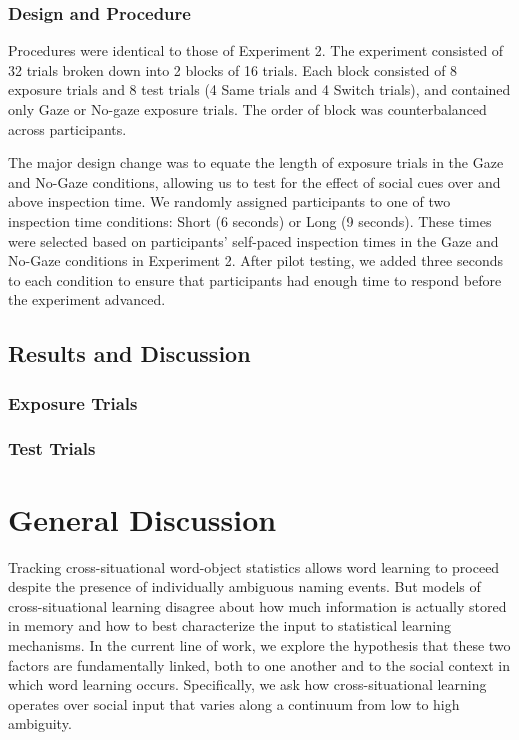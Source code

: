 \documentclass[authoryear, review]{elsarticle}
\begin{document}
\subsubsection{Design and Procedure}\label{design-and-procedure-3}

Procedures were identical to those of Experiment 2. The experiment
consisted of 32 trials broken down into 2 blocks of 16 trials. Each
block consisted of 8 exposure trials and 8 test trials (4 Same trials
and 4 Switch trials), and contained only Gaze or No-gaze exposure
trials. The order of block was counterbalanced across participants.

The major design change was to equate the length of exposure trials in
the Gaze and No-Gaze conditions, allowing us to test for the effect of
social cues over and above inspection time. We randomly assigned
participants to one of two inspection time conditions: Short (6 seconds)
or Long (9 seconds). These times were selected based on participants'
self-paced inspection times in the Gaze and No-Gaze conditions in
Experiment 2. After pilot testing, we added three seconds to each
condition to ensure that participants had enough time to respond before
the experiment advanced.

\subsection{Results and Discussion}\label{results-and-discussion-3}

\subsubsection{Exposure Trials}\label{exposure-trials-3}

\subsubsection{Test Trials}\label{test-trials-3}

\section{General Discussion}\label{general-discussion}

Tracking cross-situational word-object statistics allows word learning
to proceed despite the presence of individually ambiguous naming events.
But models of cross-situational learning disagree about how much
information is actually stored in memory and how to best characterize
the input to statistical learning mechanisms. In the current line of
work, we explore the hypothesis that these two factors are fundamentally
linked, both to one another and to the social context in which word
learning occurs. Specifically, we ask how cross-situational learning
operates over social input that varies along a continuum from low to
high ambiguity.
\end{document}
